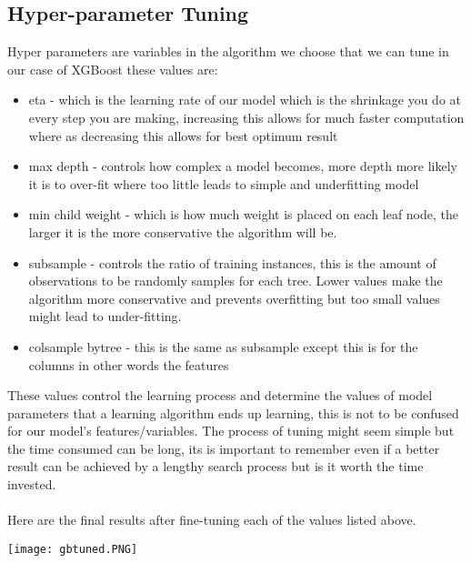 \documentclass{article}
\begin{document}
\begin{titlepage}
\subsection{Hyper-parameter Tuning}
Hyper parameters are variables in the algorithm we choose that we can tune in our case of XGBoost these values are: 
\begin{itemize}
    \item eta - which is the learning rate of our model which is the shrinkage you do at every step you are making, increasing this allows for much faster computation where as decreasing this allows for best optimum result
    \item max depth - controls how complex a model becomes, more depth more likely it is to over-fit where too little leads to simple and underfitting model
    \item min child weight - which is how much weight is placed on each leaf node, the larger it is the more conservative the algorithm will be.
    \item subsample - controls the ratio of training instances, this is the amount of observations to be randomly samples for each tree. Lower values make the algorithm more conservative and prevents overfitting but too small values might lead to under-fitting.
    \item colsample bytree - this is the same as subsample except this is for the columns in other words the features
\end{itemize}

These values control the learning process and determine the values of model parameters that a learning algorithm ends up learning, this is not to be confused for our model's features/variables. The process of tuning might seem simple but the time consumed can be long, its is important to remember even if a better result can be achieved by a lengthy search process but is it worth the time invested. \\
\\ 
Here are the final results after fine-tuning each of the values listed above. 
\begin{center}
\texttt{[image: gbtuned.PNG]}
\end{center}

\end{titlepage}
\end{document}
